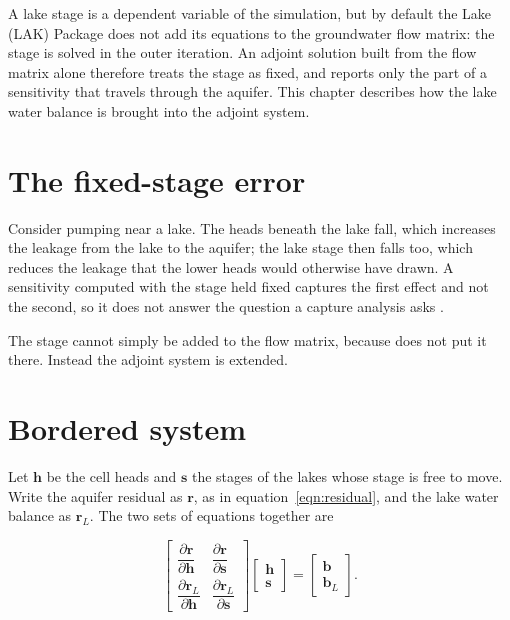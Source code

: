 A lake stage is a dependent variable of the simulation, but by default the Lake (LAK) Package does not add its equations to the groundwater flow matrix: the stage is solved in the outer iteration. An adjoint solution built from the flow matrix alone therefore treats the stage as fixed, and reports only the part of a sensitivity that travels through the aquifer. This chapter describes how the lake water balance is brought into the adjoint system.

\section*{The fixed-stage error}

Consider pumping near a lake. The heads beneath the lake fall, which increases the leakage from the lake to the aquifer; the lake stage then falls too, which reduces the leakage that the lower heads would otherwise have drawn. A sensitivity computed with the stage held fixed captures the first effect and not the second, so it does not answer the question a capture analysis asks \citep[for example,][]{leake2010,barlow2012}.

The stage cannot simply be added to the flow matrix, because \mf{} does not put it there. Instead the adjoint system is extended.

\section*{Bordered system}

Let $\mathbf{h}$ be the cell heads and $\mathbf{s}$ the stages of the lakes whose stage is free to move. Write the aquifer residual as $\mathbf{r}$, as in equation~\ref{eqn:residual}, and the lake water balance as $\mathbf{r}_{L}$. The two sets of equations together are

\begin{equation}
	\label{eqn:lak-bordered}
	\begin{bmatrix}
		\dfrac{\partial \mathbf{r}}{\partial \mathbf{h}} &
		\dfrac{\partial \mathbf{r}}{\partial \mathbf{s}} \\[2ex]
		\dfrac{\partial \mathbf{r}_{L}}{\partial \mathbf{h}} &
		\dfrac{\partial \mathbf{r}_{L}}{\partial \mathbf{s}}
	\end{bmatrix}
	\begin{bmatrix} \mathbf{h} \\ \mathbf{s} \end{bmatrix}
	=
	\begin{bmatrix} \mathbf{b} \\ \mathbf{b}_{L} \end{bmatrix}.
\end{equation}

